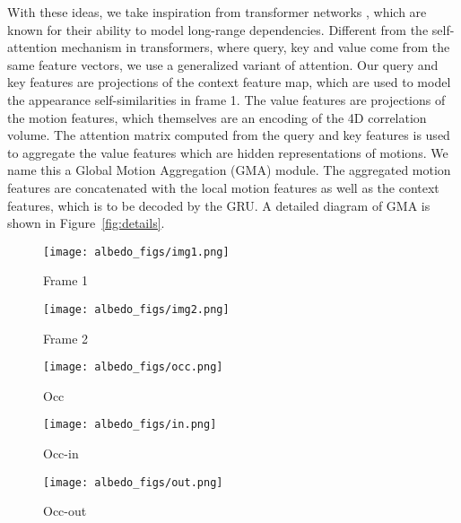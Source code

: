 \documentclass[10pt,twocolumn,letterpaper]{article}
\begin{document}
With these ideas, we take inspiration from transformer networks \cite{transformer}, which are known
for their ability to model long-range dependencies. Different from the self-attention mechanism in transformers,  
where query, key and value come from the same feature vectors, we use a generalized variant of attention.
Our query and key features are projections of the context feature map, which are used to model the
appearance self-similarities in frame 1. The value features are projections of the motion features, which
themselves are an encoding of the 4D correlation volume. The attention matrix computed from the query and key
features is used to aggregate the value features which are hidden representations of motions. We name this a Global Motion Aggregation (GMA) module. The aggregated motion features are concatenated with
the local motion features as well as the context features, which is to be decoded by the GRU. 
A detailed diagram of GMA is shown in Figure~\ref{fig:details}.


\begin{figure*}[t!]
     \centering
     \begin{subfigure}[b]{0.19\textwidth}
         \centering
         \texttt{[image: albedo\_figs/img1.png]}
         \caption{Frame 1}
         \label{fig:input1}
     \end{subfigure}
     \hfill
     \begin{subfigure}[b]{0.19\textwidth}
         \centering
         \texttt{[image: albedo\_figs/img2.png]}
         \caption{Frame 2}
         \label{fig:input2}
     \end{subfigure}
    \hfill 
     \begin{subfigure}[b]{0.19\textwidth}
         \centering
         \texttt{[image: albedo\_figs/occ.png]}
         \caption{Occ}
         \label{fig:occ1}
     \end{subfigure}
    \hfill 
     \begin{subfigure}[b]{0.19\textwidth}
         \centering
         \texttt{[image: albedo\_figs/in.png]}
         \caption{Occ-in}
         \label{fig:occ2}
     \end{subfigure}
    \hfill 
     \begin{subfigure}[b]{0.19\textwidth}
         \centering
         \texttt{[image: albedo\_figs/out.png]}
         \caption{Occ-out}
         \label{fig:occ3}
     \end{subfigure}
     \caption{\textbf{Examples of the Sintel Albedo dataset and occlusion maps.} The 
     Albedo dataset is rendered without the illumination effects. The occlusion map in
     this example contains mostly foreground objects occluding the background scene
     as well as the background on the left moving out of the field-of-view. Figure~\ref{fig:occ1}
     is the occlusion map (Occ) for this example. 
     Figure~\ref{fig:occ2} and Figure~\ref{fig:occ3}
     are the in-frame (Occ-in) and out-of-frame (Occ-out) occlusion maps respectively.}
    \label{fig:albedo}
\end{figure*} 
\end{document}
